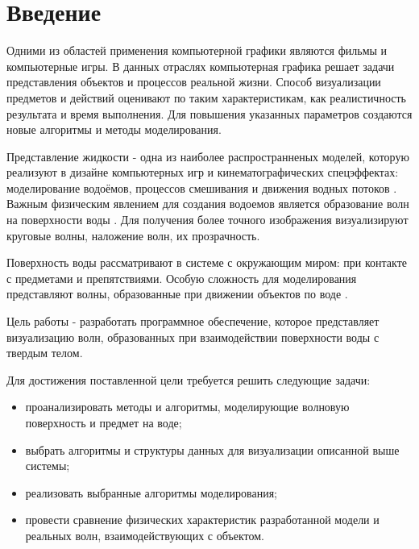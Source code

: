 \chapter*{Введение}

Одними из областей применения компьютерной графики являются  фильмы и компьютерные игры. В данных отраслях компьютерная графика решает задачи представления объектов и процессов реальной жизни. Способ визуализации предметов и действий оценивают по таким характеристикам, как реалистичность результата и время выполнения. Для повышения указанных параметров создаются новые алгоритмы и методы моделирования.

Представление жидкости - одна из наиболее распространненых моделей, которую реализуют в дизайне компьютерных игр и кинематографических спецэффектах: моделирование водоёмов, процессов смешивания и движения водных потоков \cite{large-water-bodies}. Важным физическим явлением для создания водоемов является образование волн на поверхности воды \cite{ocean-simulation}. Для получения более точного изображения визуализируют круговые волны, наложение волн, их прозрачность.

Поверхность воды рассматривают в системе с окружающим миром: при контакте с предметами и препятствиями. Особую сложность для моделирования представляют волны, образованные при движении объектов по воде \cite{dispersion-kernels}.

Цель работы - разработать программное обеспечение, которое представляет визуализацию волн, образованных при взаимодействии поверхности воды с твердым телом.

Для достижения поставленной цели требуется решить следующие задачи:

\begin{itemize}
	\item проанализировать методы и алгоритмы, моделирующие волновую поверхность и предмет на воде; 
	\item выбрать алгоритмы и структуры данных для визуализации описанной выше системы; 
	\item реализовать выбранные алгоритмы моделирования;
	\item провести сравнение физических характеристик разработанной модели и реальных волн, взаимодействующих с объектом.
\end{itemize}
